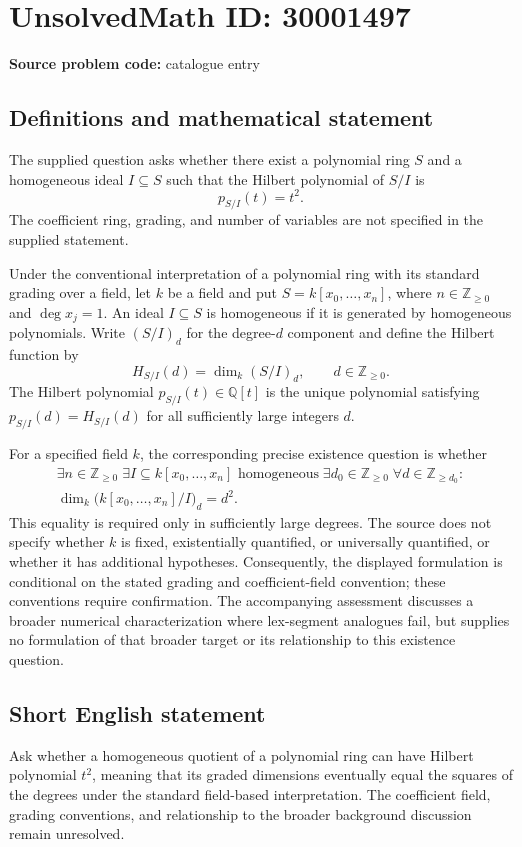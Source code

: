 \documentclass[11pt]{article}
\newcommand{\Z}{\mathbb{Z}}
\newcommand{\Q}{\mathbb{Q}}
\begin{document}
\section*{UnsolvedMath ID: 30001497}
\textbf{Source problem code:} catalogue entry
\subsection{Definitions and mathematical statement}
The supplied question asks whether there exist a polynomial ring \(S\) and a homogeneous ideal \(I\subseteq S\) such that the Hilbert polynomial of \(S/I\) is
\[
p_{S/I}(t)=t^2.
\]
The coefficient ring, grading, and number of variables are not specified in the supplied statement.

Under the conventional interpretation of a polynomial ring with its standard grading over a field, let \(k\) be a field and put \(S=k[x_0,\ldots,x_n]\), where \(n\in\Z_{\geq 0}\) and \(\deg x_j=1\). An ideal \(I\subseteq S\) is homogeneous if it is generated by homogeneous polynomials. Write \((S/I)_d\) for the degree-\(d\) component and define the Hilbert function by
\[
H_{S/I}(d)=\dim_k (S/I)_d,\qquad d\in\Z_{\geq 0}.
\]
The Hilbert polynomial \(p_{S/I}(t)\in\Q[t]\) is the unique polynomial satisfying \(p_{S/I}(d)=H_{S/I}(d)\) for all sufficiently large integers \(d\).

For a specified field \(k\), the corresponding precise existence question is whether
\[
\begin{gathered}
\exists n\in\Z_{\geq 0}\;\exists I\subseteq k[x_0,\ldots,x_n]\text{ homogeneous}\;\exists d_0\in\Z_{\geq 0}\;\forall d\in\Z_{\geq d_0}:\\
\dim_k\bigl(k[x_0,\ldots,x_n]/I\bigr)_d=d^2.
\end{gathered}
\]
This equality is required only in sufficiently large degrees. The source does not specify whether \(k\) is fixed, existentially quantified, or universally quantified, or whether it has additional hypotheses. Consequently, the displayed formulation is conditional on the stated grading and coefficient-field convention; these conventions require confirmation. The accompanying assessment discusses a broader numerical characterization where lex-segment analogues fail, but supplies no formulation of that broader target or its relationship to this existence question.
\subsection{Short English statement}
Ask whether a homogeneous quotient of a polynomial ring can have Hilbert polynomial \(t^2\), meaning that its graded dimensions eventually equal the squares of the degrees under the standard field-based interpretation. The coefficient field, grading conventions, and relationship to the broader background discussion remain unresolved.
\end{document}
